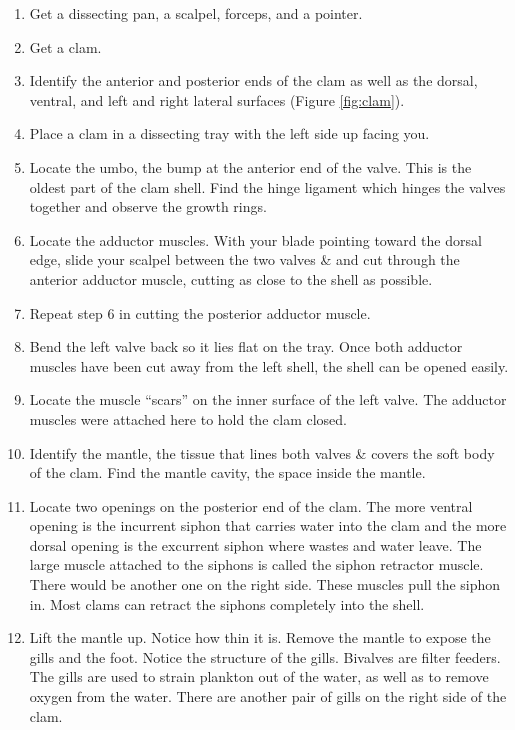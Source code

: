 \documentclass[]{book}
\providecommand{\tightlist}{%
  \setlength{\itemsep}{0pt}\setlength{\parskip}{0pt}}
\begin{document}
\begin{enumerate}
\def\labelenumi{\arabic{enumi}.}
\tightlist
\item
  Get a dissecting pan, a scalpel, forceps, and a pointer.
\item
  Get a clam.
\item
  Identify the anterior and posterior ends of the clam as well as the dorsal, ventral, and left and right lateral surfaces (Figure \ref{fig:clam}).
\item
  Place a clam in a dissecting tray with the left side up facing you.
\item
  Locate the umbo, the bump at the anterior end of the valve. This is the oldest part of the clam shell. Find the hinge ligament which hinges the valves together and observe the growth rings.
\item
  Locate the adductor muscles. With your blade pointing toward the dorsal edge, slide your scalpel between the two valves \& and cut through the anterior adductor muscle, cutting as close to the shell as possible.
\item
  Repeat step 6 in cutting the posterior adductor muscle.
\item
  Bend the left valve back so it lies flat on the tray. Once both adductor muscles have been cut away from the left shell, the shell can be opened easily.
\item
  Locate the muscle ``scars'' on the inner surface of the left valve. The adductor muscles were attached here to hold the clam closed.
\item
  Identify the mantle, the tissue that lines both valves \& covers the soft body of the clam. Find the mantle cavity, the space inside the mantle.
\item
  Locate two openings on the posterior end of the clam. The more ventral opening is the incurrent siphon that carries water into the clam and the more dorsal opening is the excurrent siphon where wastes and water leave.
  The large muscle attached to the siphons is called the siphon retractor muscle. There would be another one on the right side. These muscles pull the siphon in. Most clams can retract the siphons completely into the shell.
\item
  Lift the mantle up. Notice how thin it is. Remove the mantle to expose the gills and the foot. Notice the structure of the gills. Bivalves are filter feeders. The gills are used to strain plankton out of the water, as well as to remove oxygen from the water. There are another pair of gills on the right side of the clam.

\end{enumerate}
\end{document}
